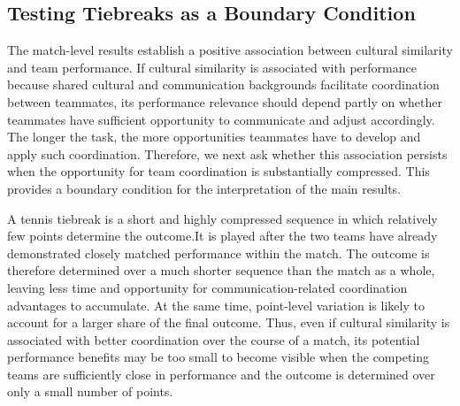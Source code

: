 \documentclass[10pt]{article}
\begin{document}
\subsection{Testing Tiebreaks as a Boundary Condition} 



The match-level results establish a positive association between cultural similarity and team performance. If cultural similarity is associated with performance because shared cultural and communication backgrounds facilitate coordination between teammates, its performance relevance should depend partly on whether teammates have sufficient opportunity to communicate and adjust accordingly. The longer the task, the more opportunities teammates have to develop and apply such coordination. Therefore, we next ask whether this association persists when the opportunity for team coordination is substantially compressed. This provides a boundary condition for the interpretation of the main results. 

A tennis tiebreak  is a short and highly compressed sequence in which relatively few points determine the outcome.It is played after the two teams have already demonstrated closely matched performance within the match. The outcome is therefore determined over a much shorter sequence than the match as a whole, leaving less time and opportunity for communication-related coordination advantages to accumulate. At the same time, point-level variation is likely to account for a larger share of the final outcome. Thus, even if cultural similarity is associated with better coordination over the course of a match, its potential performance benefits may be too small to become visible when the competing teams are sufficiently close in performance and the outcome is determined over only a small number of points.
\end{document}
